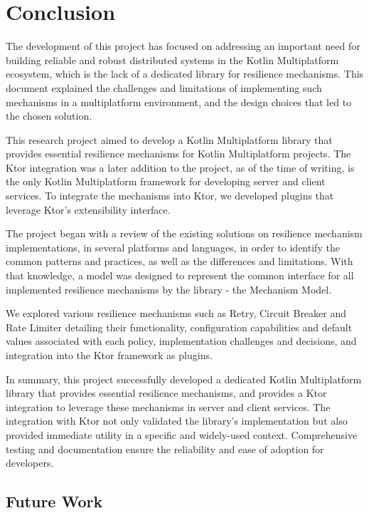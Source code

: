 \chapter{Conclusion}\label{ch:conclusion}

The development of this project has focused
on addressing an important need
for building reliable and robust distributed systems in the Kotlin Multiplatform ecosystem, which is the lack of a dedicated library for resilience mechanisms.
This document explained the challenges and limitations of implementing such mechanisms in a multiplatform environment,
and the design choices that led to the chosen solution.

This research project aimed to develop a Kotlin Multiplatform library
that provides essential resilience mechanisms for Kotlin Multiplatform projects.
The Ktor integration was a later addition to the project, as of the time of writing, is
the only Kotlin Multiplatform framework for developing server and client services.
To integrate the mechanisms into Ktor, we developed plugins that leverage Ktor's extensibility interface.

The project began with a review of the existing solutions on resilience mechanism implementations,
in several platforms and languages, in order to identify the common patterns and practices, as well as the differences and limitations.
With that knowledge,
a model was designed to represent the common interface for all implemented resilience mechanisms by the library -
the Mechanism Model.

We explored various resilience mechanisms such as Retry, Circuit Breaker and Rate Limiter
detailing their functionality, configuration capabilities and default values associated with each policy,
implementation challenges and decisions, and integration into the Ktor framework as plugins.

In summary,
this project successfully developed a dedicated Kotlin Multiplatform library
that provides essential resilience mechanisms,
and provides a Ktor integration to leverage these mechanisms in server and client services.
The integration with Ktor not only validated the library's implementation but also provided immediate utility in a specific and widely-used context.
Comprehensive testing and documentation ensure the reliability and ease of adoption for developers.


\section{Future Work}\label{sec:future-work}

